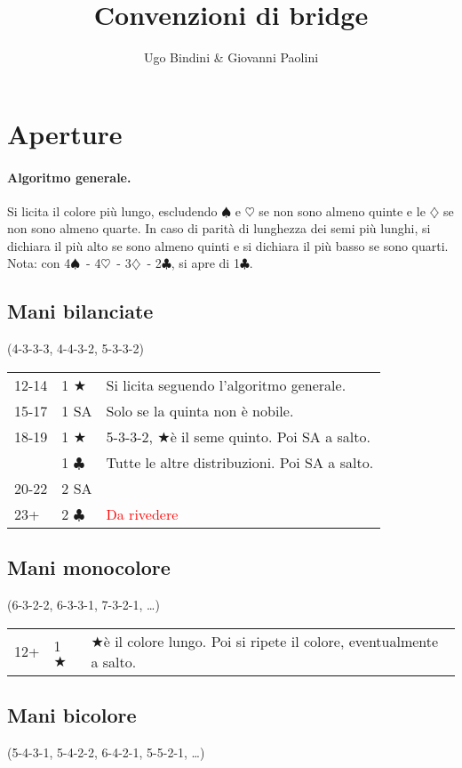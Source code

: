 \documentclass[a4paper,10pt]{article}
\title{Convenzioni di bridge}
\author{Ugo Bindini \& Giovanni Paolini}
\renewcommand{\c}{$\clubsuit$\xspace}
\renewcommand{\d}{$\diamondsuit$\xspace}
\newcommand{\h}{$\heartsuit$\xspace}
\newcommand{\s}{$\spadesuit$\xspace}
\renewcommand{\j}{$\bigstar$\xspace}
\newcommand{\sa}{SA\xspace}
\newcommand{\smallspace}{\vskip0.3cm}
\newcommand{\note}[1]{\textcolor{red}{#1}}
\newenvironment{threecol}
  {\smallspace\noindent\begin{tabular}{l l p{0.7\textwidth}}}
  {\end{tabular}\smallspace}
\begin{document}
\maketitle


\section{Aperture}

\paragraph{Algoritmo generale.}
Si licita il colore pi\`u lungo, escludendo \s e \h se non sono almeno quinte e le \d se non sono almeno quarte.
In caso di parit\`a di lunghezza dei semi pi\`u lunghi, si dichiara il pi\`u alto se sono almeno quinti e si dichiara il pi\`u basso se sono quarti.
Nota: con 4\s\ - 4\h\ - 3\d\ - 2\c, si apre di 1\c.

\subsection{Mani bilanciate}
(4-3-3-3, 4-4-3-2, 5-3-3-2)
\smallspace

\begin{threecol}
 12-14 & 1 \j & Si licita seguendo l'algoritmo generale.\\
 15-17 & 1 \sa & Solo se la quinta non \`e nobile.\\
 18-19 & 1 \j & 5-3-3-2, \j \`e il seme quinto. Poi \sa a salto.\\
       & 1 \c & Tutte le altre distribuzioni. Poi \sa a salto.\\
 20-22 & 2 \sa & \\
 23+ & 2 \c & \note{Da rivedere}
\end{threecol}


\subsection{Mani monocolore}
(6-3-2-2, 6-3-3-1, 7-3-2-1, \dots)

\begin{threecol}
 12+ & 1 \j & \j \`e il colore lungo. Poi si ripete il colore, eventualmente a salto.
\end{threecol}


\subsection{Mani bicolore}
(5-4-3-1, 5-4-2-2, 6-4-2-1, 5-5-2-1, \dots)
\end{document}
